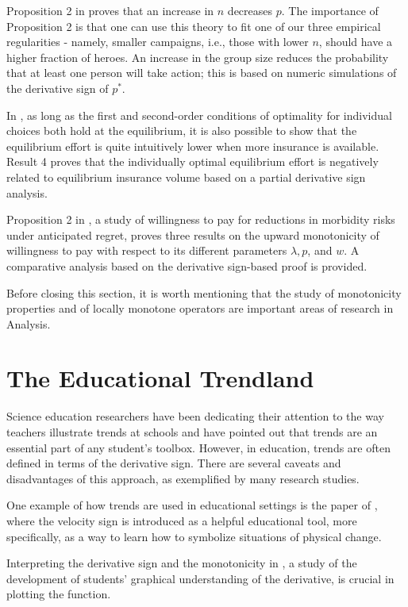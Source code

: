 \documentclass[11pt]{book}
\begin{document}
Proposition 2 in \cite{blomberg2008have} proves that an increase
in $n$ decreases $p$. The importance of Proposition 2 is that one can use this theory to fit one of our three empirical
regularities - namely, smaller campaigns, i.e., those with lower
$n$, should have a higher fraction of heroes. An increase
in the group size reduces the probability that at least one person
will take action; this is based on numeric simulations of the derivative
sign of $p^{*}$.

In \cite{bertola2015hidden}, as long as the first and second-order
conditions of optimality for individual choices both hold at the equilibrium,
it is also possible to show that the equilibrium effort is quite intuitively
lower when more insurance is available. Result 4 proves that the individually
optimal equilibrium effort is negatively related to equilibrium insurance
volume based on a partial derivative sign analysis.

Proposition 2 in \cite{zheng2018willingness}, a study of willingness to pay for reductions in morbidity risks under anticipated
regret, proves three results
on the upward monotonicity of willingness to pay with respect to its different parameters
$\lambda,p$, and $w$. A comparative analysis based on the derivative
sign-based proof is provided.

Before closing this section, it is worth mentioning that the study of monotonicity properties and of locally monotone operators are important areas of research in Analysis.

\chapter{The Educational Trendland}
\label{educational_trendland}
Science education researchers have been dedicating their attention to the way teachers illustrate trends
at schools and have pointed out that trends are an essential part of any student's toolbox. However, in education, trends are often defined in terms of the derivative sign. There are several caveats and disadvantages of this approach, as exemplified by many research studies.

One example of how trends are used in educational settings is the paper of \cite{nemirovsky1994ways}, where the velocity sign is introduced as a
helpful educational tool, more specifically, as a way to learn how to symbolize situations of physical
change.

Interpreting the derivative sign and the monotonicity in \cite{asiala1997development}, a study of the development of students’ graphical understanding of the derivative, is crucial in plotting the function.
\end{document}
